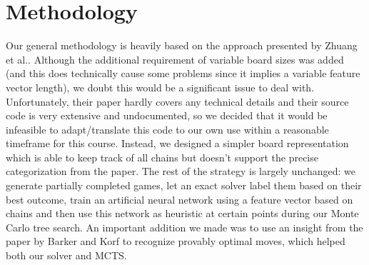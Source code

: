 \section{Methodology}

Our general methodology is heavily based on the approach presented by Zhuang et al.\cite{7317912}. Although the additional requirement of variable board sizes was added (and this does technically cause some problems since it implies a variable feature vector length), we doubt this would be a significant issue to deal with. Unfortunately, their paper hardly covers any technical details and their source code is very extensive and undocumented, so we decided that it would be infeasible to adapt/translate this code to our own use within a reasonable timeframe for this course. Instead, we designed a simpler board representation which is able to keep track of all chains but doesn't support the precise categorization from the paper. The rest of the strategy is largely unchanged: we generate partially completed games, let an exact solver label them based on their best outcome, train an artificial neural network using a feature vector based on chains and then use this network as heuristic at certain points during our Monte Carlo tree search. An important addition we made was to use an insight from the paper by Barker and Korf\cite{Barker:2012:SD:2900728.2900788} to recognize provably optimal moves, which helped both our solver and MCTS.




